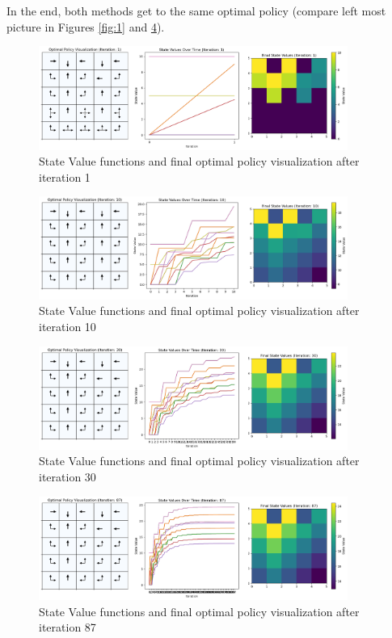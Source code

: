 \documentclass{article} %
\begin{document}
	In the end, both methods get to the same optimal policy (compare left most picture in Figures \ref{fig:1} and \ref{fig:5}).
	
	\begin{figure}[h!]
		\centering
		\includegraphics[width=0.9\textwidth]{images/3.1b.1.png}
		\caption{State Value functions and final optimal policy visualization after iteration 1}
		\label{fig:2}
	\end{figure}
	
		\begin{figure}[h!]
		\centering
		\includegraphics[width=0.9\textwidth]{images/3.1b.2.png}
		\caption{State Value functions and final optimal policy visualization after iteration 10}
		\label{fig:3}
	\end{figure}
	
	
	\begin{figure}[h!]
		\centering
		\includegraphics[width=0.9\textwidth]{images/3.1b.3.png}
		\caption{State Value functions and final optimal policy visualization after iteration 30}
		\label{fig:4}
	\end{figure}
	
	\begin{figure}[h!]
		\centering
		\includegraphics[width=0.9\textwidth]{images/3.1b.4.png}
		\caption{State Value functions and final optimal policy visualization after iteration 87}
		\label{fig:5}
	\end{figure}
	
\end{document}
